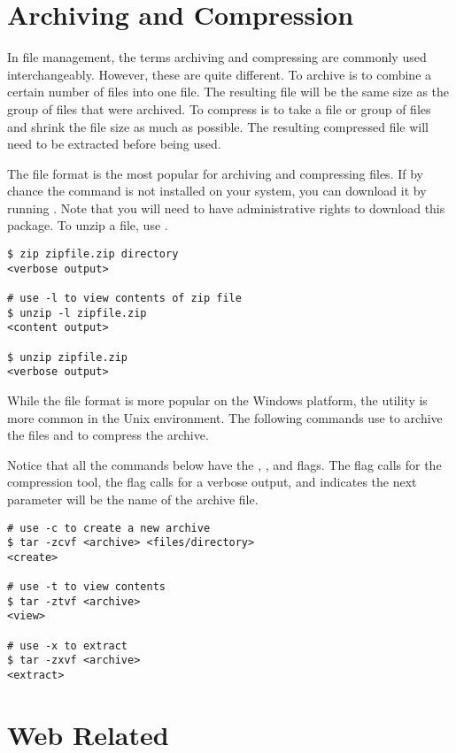\section*{Archiving and Compression}
In file management, the terms archiving and compressing are commonly used interchangeably. However, these are quite different. To archive is to combine a certain number of files into one file. The resulting file will be the same size as the group of files that were archived.
To compress is to take a file or group of files and shrink the file size as much as possible. The resulting compressed file will need to be extracted before being used.

The  file format is the most popular for archiving and compressing files. If by chance the  command is not installed on your system, you can download it by running . Note that you will need to have administrative rights to download this package. To unzip a file, use .

\begin{lstlisting}
$ zip zipfile.zip directory
<verbose output>

# use -l to view contents of zip file
$ unzip -l zipfile.zip
<content output>

$ unzip zipfile.zip
<verbose output>
\end{lstlisting}

While the  file format is more popular on the Windows platform, the  utility is more common in the Unix environment. The following commands use  to archive the files and  to compress the archive. 

Notice that all the commands below have the , , and  flags. The  flag calls for the  compression tool, the  flag calls for a verbose output, and  indicates the next parameter will be the name of the archive file. 

\begin{lstlisting}
# use -c to create a new archive
$ tar -zcvf <archive> <files/directory> 
<create>

# use -t to view contents
$ tar -ztvf <archive>                    
<view>

# use -x to extract
$ tar -zxvf <archive>                   
<extract>
\end{lstlisting}


\section*{Web Related}

